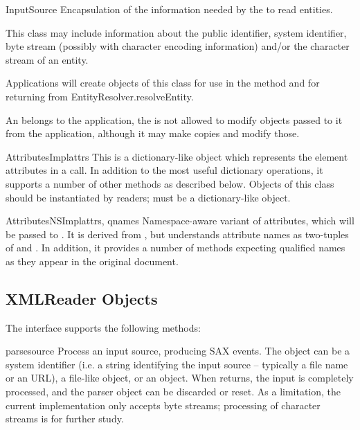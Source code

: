 \begin{classdesc}{InputSource}{}
  Encapsulation of the information needed by the  to
  read entities.

  This class may include information about the public identifier,
  system identifier, byte stream (possibly with character encoding
  information) and/or the character stream of an entity.

  Applications will create objects of this class for use in the
   method and for returning from
  EntityResolver.resolveEntity.

  An  belongs to the application, the
   is not allowed to modify  objects
  passed to it from the application, although it may make copies and
  modify those.
\end{classdesc}

\begin{classdesc}{AttributesImpl}{attrs}
  This is a dictionary-like object which represents the element
  attributes in a  call. In addition to the
  most useful dictionary operations, it supports a number of other
  methods as described below. Objects of this class should be
  instantiated by readers;  must be a dictionary-like
  object.
\end{classdesc}

\begin{classdesc}{AttributesNSImpl}{attrs, qnames}
  Namespace-aware variant of attributes, which will be passed to
  . It is derived from ,
  but understands attribute names as two-tuples of 
  and . In addition, it provides a number of methods
  expecting qualified names as they appear in the original document.
\end{classdesc}


\subsection{XMLReader Objects \label{xmlreader-objects}}

The  interface supports the following methods:

\begin{methoddesc}[XMLReader]{parse}{source}
  Process an input source, producing SAX events. The 
  object can be a system identifier (i.e. a string identifying the
  input source -- typically a file name or an URL), a file-like
  object, or an  object. When 
  returns, the input is completely processed, and the parser object
  can be discarded or reset. As a limitation, the current implementation
  only accepts byte streams; processing of character streams is for
  further study.
\end{methoddesc}

